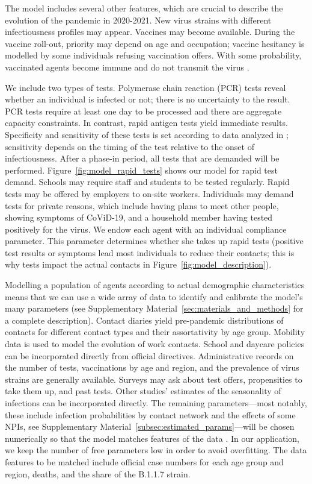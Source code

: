 The model includes several other features, which are crucial to describe the evolution of
the pandemic in 2020-2021. New virus strains with different infectiousness profiles may
appear. Vaccines may become available. During the vaccine roll-out, priority may depend
on age and occupation; vaccine hesitancy is modelled by some individuals refusing
vaccination offers. With some probability, vaccinated agents become immune and do not
transmit the virus \citep{Hunter2021, LevineTiefenbrun2021, Petter2021, Pritchard2021}.

We include two types of tests. Polymerase chain reaction (PCR) tests reveal whether an
individual is infected or not; there is no uncertainty to the result. PCR tests require
at least one day to be processed and there are aggregate capacity constraints. In
contrast, rapid antigen tests yield immediate results. Specificity and sensitivity of
these tests is set according to data analyzed in \cite{Bruemmer2021, Smith2021};
sensitivity depends on the timing of the test relative to the onset of infectiousness.
After a phase-in period, all tests that are demanded will be performed.
Figure~\ref{fig:model_rapid_tests} shows our model for rapid test demand. Schools may
require staff and students to be tested regularly. Rapid tests may be offered by
employers to on-site workers. Individuals may demand tests for private reasons, which
include having plans to meet other people, showing symptoms of CoViD-19, and a household
member having tested positively for the virus. We endow each agent with an individual
compliance parameter. This parameter determines whether she takes up rapid tests
(positive test results or symptoms lead most individuals to reduce their contacts; this
is why tests impact the actual contacts in Figure~\ref{fig:model_description}).

Modelling a population of agents according to actual demographic characteristics means
that we can use a wide array of data to identify and calibrate the model's many
parameters (see Supplementary Material~\ref{sec:materials_and_methods} for a complete
description). Contact diaries yield pre-pandemic distributions of contacts for different
contact types and their assortativity by age group. Mobility data is used to model the
evolution of work contacts. School and daycare policies can be incorporated directly
from official directives. Administrative records on the number of tests, vaccinations by
age and region, and the prevalence of virus strains are generally available. Surveys may
ask about test offers, propensities to take them up, and past tests. Other studies'
estimates of the seasonality of infections can be incorporated directly. The remaining
parameters---most notably, these include infection probabilities by contact network and
the effects of some NPIs, see Supplementary
Material~\ref{subsec:estimated_params}---will be chosen numerically so that the model
matches features of the data \citep[see][for the general method]{McFadden1989}. In our
application, we keep the number of free parameters low in order to avoid overfitting.
The data features to be matched include official case numbers for each age group and
region, deaths, and the share of the B.1.1.7 strain.

